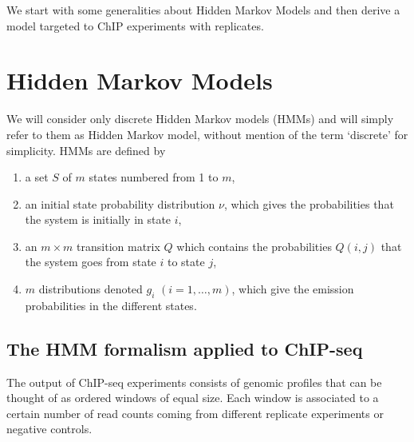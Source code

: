 \documentclass[12pt]{article}
\begin{document}
{}





\newpage
\begin{appendices}



We start with some generalities about Hidden Markov Models and then
derive a model targeted to ChIP experiments with replicates.
  
\section{Hidden Markov Models}

    We will consider only discrete Hidden Markov models (HMMs) and
    will simply refer to them as Hidden Markov model, without mention
    of the term `discrete' for simplicity.  HMMs are defined by 

    \begin{enumerate}
      \item a set $S$ of $m$ states numbered from 1 to $m$,
      \item an initial state probability distribution $\nu$, which
      gives the probabilities that the system is initially in state $i$,
      \item an $m \times m$ transition matrix $Q$ which contains the
      probabilities $Q(i,j)$ that the system goes from state $i$ to
      state $j$,
      \item $m$ distributions denoted $g_i$ $(i = 1, \ldots, m)$, which
      give the emission probabilities in the different states.
    \end{enumerate}

\subsection{The HMM formalism applied to ChIP-seq}
\label{sec:HMM_formalism}

    The output of ChIP-seq experiments consists of genomic profiles
    that can be thought of as ordered windows of equal size. Each
    window is associated to a certain number of read counts coming
    from different replicate experiments or negative controls.


\end{appendices}
\end{document}
